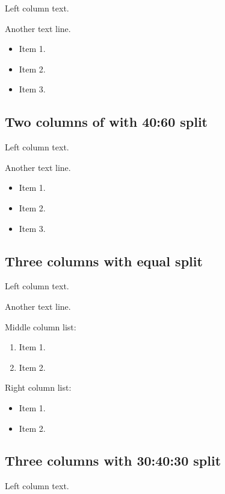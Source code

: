 \documentclass[
]{beamer}
\providecommand{\tightlist}{%
  \setlength{\itemsep}{0pt}\setlength{\parskip}{0pt}}
\begin{document}
Left column text.

Another text line.

\begin{itemize}
\tightlist
\item
  Item 1.
\item
  Item 2.
\item
  Item 3.
\end{itemize}

\subsection{Two columns of with 40:60
split}\label{two-columns-of-with-4060-split}

Left column text.

Another text line.

\begin{itemize}
\tightlist
\item
  Item 1.
\item
  Item 2.
\item
  Item 3.
\end{itemize}

\subsection{Three columns with equal
split}\label{three-columns-with-equal-split}

Left column text.

Another text line.

Middle column list:

\begin{enumerate}
\def\labelenumi{\arabic{enumi}.}
\tightlist
\item
  Item 1.
\item
  Item 2.
\end{enumerate}

Right column list:

\begin{itemize}
\tightlist
\item
  Item 1.
\item
  Item 2.
\end{itemize}

\subsection{Three columns with 30:40:30
split}\label{three-columns-with-304030-split}

Left column text.
\end{document}
